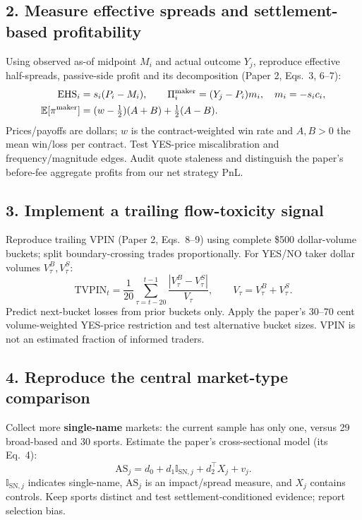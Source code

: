 \documentclass[11pt,letterpaper]{article}
\newcommand{\E}{\mathbb{E}}
\begin{document}
\subsection{2. Measure effective spreads and settlement-based profitability}
Using observed as-of midpoint $M_i$ and actual outcome $Y_j$, reproduce effective half-spreads, passive-side profit and its decomposition (Paper 2, Eqs.~3, 6--7):
\begin{align}
 \mathrm{EHS}_i&=s_i(P_i-M_i),\qquad
 \Pi_i^{\rm maker}=(Y_j-P_i)m_i,\quad m_i=-s_ic_i, \label{eq:spreadprofit}\\
 \E[\pi^{\rm maker}]&=(w-\tfrac12)(A+B)+\tfrac12(A-B). \label{eq:decomposition}
\end{align}
Prices/payoffs are dollars; $w$ is the contract-weighted win rate and $A,B>0$ the mean win/loss per contract. Test YES-price miscalibration and frequency/magnitude edges. Audit quote staleness and distinguish the paper's before-fee aggregate profits from our net strategy PnL.

\subsection{3. Implement a trailing flow-toxicity signal}
Reproduce trailing VPIN (Paper 2, Eqs.~8--9) using complete \$500 dollar-volume buckets; split boundary-crossing trades proportionally. For YES/NO taker dollar volumes $V^B_\tau,V^S_\tau$:
\begin{equation}
 \mathrm{TVPIN}_t=\frac1{20}\sum_{\tau=t-20}^{t-1}
 \frac{|V^B_\tau-V^S_\tau|}{V_\tau},\qquad
 V_\tau=V^B_\tau+V^S_\tau.
 \label{eq:vpin}
\end{equation}
Predict next-bucket losses from prior buckets only. Apply the paper's 30--70 cent volume-weighted YES-price restriction and test alternative bucket sizes. VPIN is not an estimated fraction of informed traders.

\subsection{4. Reproduce the central market-type comparison}
Collect more \textbf{single-name} markets: the current sample has only one, versus 29 broad-based and 30 sports. Estimate the paper's cross-sectional model (its Eq.~4):
\begin{equation}
 \mathrm{AS}_j=d_0+d_1\mathbb{I}_{\mathrm{SN},j}+d_2^{\top}X_j+v_j.
 \label{eq:crosssection}
\end{equation}
$\mathbb{I}_{\mathrm{SN},j}$ indicates single-name, $\mathrm{AS}_j$ is an impact/spread measure, and $X_j$ contains controls. Keep sports distinct and test settlement-conditioned evidence; report selection bias.
\end{document}
